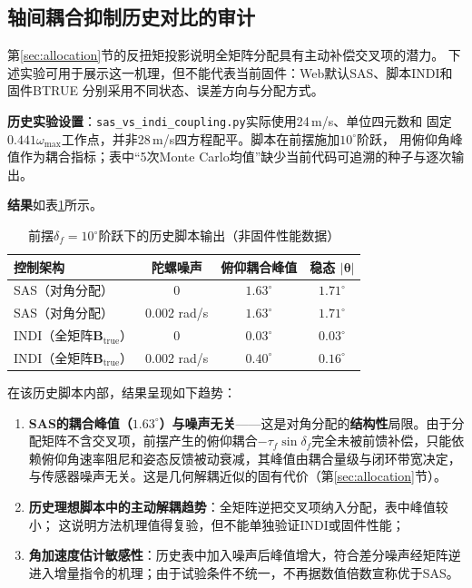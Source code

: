 \subsection{轴间耦合抑制历史对比的审计}
\label{sec:coupling_rejection}

第\ref{sec:allocation}节的反扭矩投影说明全矩阵分配具有主动补偿交叉项的潜力。
下述实验可用于展示这一机理，但不能代表当前固件：Web默认SAS、脚本INDI和固件BTRUE
分别采用不同状态、误差方向与分配方式。

\textbf{历史实验设置}：\texttt{sas\_vs\_indi\_coupling.py}实际使用24\,m/s、单位四元数和
固定$0.441\omega_{\max}$工作点，并非28\,m/s四方程配平。脚本在前摆施加$10^\circ$阶跃，
用俯仰角峰值作为耦合指标；表中“5次Monte Carlo均值”缺少当前代码可追溯的种子与逐次输出。

\textbf{结果}如表\ref{tab:coupling_rejection}所示。

\begin{table}[H]
\centering
\caption{前摆$\delta_f=10^\circ$阶跃下的历史脚本输出（非固件性能数据）}
\label{tab:coupling_rejection}
\small
\begin{tabular}{l c c c}
\toprule
\textbf{控制架构} & \textbf{陀螺噪声} & \textbf{俯仰耦合峰值} & \textbf{稳态} $\boldsymbol{|\theta|}$ \\
\midrule
SAS（对角分配） & 0 & $1.63^\circ$ & $1.71^\circ$ \\
SAS（对角分配） & 0.002 rad/s & $1.63^\circ$ & $1.71^\circ$ \\
INDI（全矩阵$\mathbf{B}_{\mathrm{true}}$） & 0 & $\mathbf{0.03^\circ}$ & $0.03^\circ$ \\
INDI（全矩阵$\mathbf{B}_{\mathrm{true}}$） & 0.002 rad/s & $\mathbf{0.40^\circ}$ & $0.16^\circ$ \\
\bottomrule
\end{tabular}
\end{table}

在该历史脚本内部，结果呈现如下趋势：

\begin{enumerate}[label=(\arabic*)]
    \item \textbf{SAS的耦合峰值（$1.63^\circ$）与噪声无关}——这是对角分配的\textbf{结构性}局限。由于分配矩阵不含交叉项，前摆产生的俯仰耦合$-\tau_f\sin\delta_f$完全未被前馈补偿，只能依赖俯仰角速率阻尼和姿态反馈被动衰减，其峰值由耦合量级与闭环带宽决定，与传感器噪声无关。这是几何解耦近似的固有代价（第\ref{sec:allocation}节）。
    \item \textbf{历史理想脚本中的主动解耦趋势}：全矩阵逆把交叉项纳入分配，表中峰值较小；
          这说明方法机理值得复验，但不能单独验证INDI或固件性能；
    \item \textbf{角加速度估计敏感性}：历史表中加入噪声后峰值增大，符合差分噪声经矩阵逆
          进入增量指令的机理；由于试验条件不统一，不再据数值倍数宣称优于SAS。
\end{enumerate}

